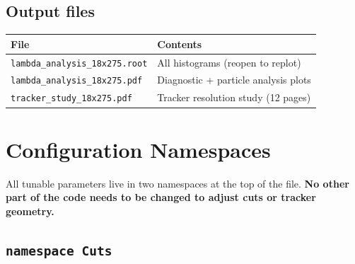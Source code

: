 \documentclass[11pt]{article}
\begin{document}
\subsection{Output files}

\begin{center}
\begin{tabular}{ll}
\toprule
File & Contents \\
\midrule
\texttt{lambda\_analysis\_18x275.root} & All histograms (reopen to replot) \\
\texttt{lambda\_analysis\_18x275.pdf} & Diagnostic + particle analysis plots \\
\texttt{tracker\_study\_18x275.pdf} & Tracker resolution study (12 pages) \\
\bottomrule
\end{tabular}
\end{center}

\section{Configuration Namespaces}

All tunable parameters live in two namespaces at the top of the file.
\textbf{No other part of the code needs to be changed to adjust cuts or
tracker geometry.}

\subsection{\texttt{namespace Cuts}}
\end{document}

